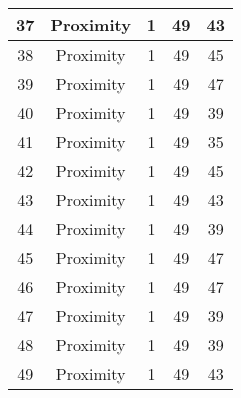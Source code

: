 \documentclass[results.tex]{subfiles}
\begin{document}
\begin{center}
\begin{tabular}{| c || c | c | c | c |}
            \hline
            37                      & Proximity                    & 1                      & 49                      & 43                   \\
            \hline
            38                      & Proximity                    & 1                      & 49                      & 45                   \\
            \hline
            39                      & Proximity                    & 1                      & 49                      & 47                   \\
            \hline
            40                      & Proximity                    & 1                      & 49                      & 39                   \\
            \hline
            41                      & Proximity                    & 1                      & 49                      & 35                   \\
            \hline
            42                      & Proximity                    & 1                      & 49                      & 45                   \\
            \hline
            43                      & Proximity                    & 1                      & 49                      & 43                   \\
            \hline
            44                      & Proximity                    & 1                      & 49                      & 39                   \\
            \hline
            45                      & Proximity                    & 1                      & 49                      & 47                   \\
            \hline
            46                      & Proximity                    & 1                      & 49                      & 47                   \\
            \hline
            47                      & Proximity                    & 1                      & 49                      & 39                   \\
            \hline
            48                      & Proximity                    & 1                      & 49                      & 39                   \\
            \hline
            49                      & Proximity                    & 1                      & 49                      & 43                   \\
            \hline
        \end{tabular}
    \end{center}
\end{document}
